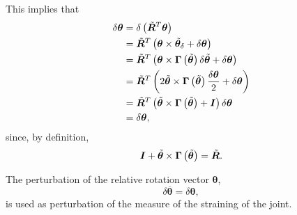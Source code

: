 \documentclass[10pt,fleqn,subeqn]{report}
\newcommand{\T}[1]{\bm{#1}}
\begin{document}
This implies that
\begin{align}
	\delta\T{\theta}
	&= \delta\plbr{\tilde{\T{R}}^T \T{\theta}}
	\nonumber \\
	&= \tilde{\T{R}}^T \plbr{
		\T{\theta} \times \tilde{\T{\theta}}_{\delta}
		+ \delta\T{\theta}
	}
	\nonumber \\
	&= \tilde{\T{R}}^T \plbr{
		\T{\theta} \times \T{\Gamma}\plbr{\tilde{\T{\theta}}} \delta\tilde{\T{\theta}}
		+ \delta\T{\theta}
	}
	\nonumber \\
	&= \tilde{\T{R}}^T \plbr{
		2 \tilde{\T{\theta}} \times \T{\Gamma}\plbr{\tilde{\T{\theta}}} \frac{\delta\T{\theta}}{2}
		+ \delta\T{\theta}
	}
	\nonumber \\
	&= \tilde{\T{R}}^T \plbr{
		\tilde{\T{\theta}} \times \T{\Gamma}\plbr{\tilde{\T{\theta}}}
		+ \T{I}
	} \delta\T{\theta}
	\nonumber \\
	&= \delta\T{\theta} ,
\end{align}
since, by definition,
\begin{equation}
	\T{I} + \tilde{\T{\theta}} \times \T{\Gamma}\plbr{\tilde{\T{\theta}}} = \tilde{\T{R}} .
\end{equation}

The perturbation of the relative rotation vector $\T{\theta}$, 
\begin{equation}
	\delta\overline{\T{\theta}} = \delta\T{\theta} ,
\end{equation}
is used as perturbation of the measure of the straining of the joint.
\end{document}
